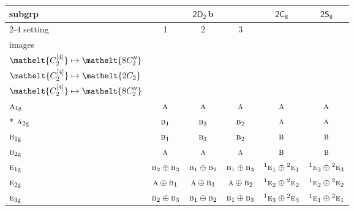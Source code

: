 \documentclass[10pt,a4paper]{article}
\numberwithin{equation}{section}
\newcommand{\eltfont}[1]{{\let\sigma\eltsigma\mathelt{#1}}}
\newcommand{\grp}[1]{\mathsf{#1}}
\newcommand{\irr}[1]{\text{\normalfont\scshape #1}}
\newcommand{\conjpair}[1]{{}^{#1}}
\newcommand{\cls}[1]{\eltfont{#1}}
\newcommand{\ptag}[1]{\mathrm{#1}}
\newcommand{\clsletter}[1]{\,{\scriptsize\color{black!55}#1}}
\newcommand{\genidx}[2]{#1^{[\mathrm{#2}]}}
\begin{document}
{\small\begin{longtable}{@{}lccccc@{}}\toprule
subgrp & \multicolumn{3}{c}{\href{2D2.pdf}{$\grp{2D_{2}}$}\clsletter{b}} & \href{2C8.pdf}{$\grp{2C_{8}}$} & \href{2S8.pdf}{$\grp{2S_{8}}$}\\\cmidrule(lr){2-4}
setting & 1 & 2 & 3 &  & \\
images & {\scriptsize\begin{tabular}[t]{@{}c@{}}$\cls{\genidx{C_{2}}{2}} \mapsto \cls{2C_{2}}$\\$\cls{\genidx{C_{2}}{4}} \mapsto \cls{8C_{2}''}$\end{tabular}} & {\scriptsize\begin{tabular}[t]{@{}c@{}}$\cls{\genidx{C_{2}}{2}} \mapsto \cls{8C_{2}''}$\\$\cls{\genidx{C_{2}}{4}} \mapsto \cls{2C_{2}}$\end{tabular}} & {\scriptsize\begin{tabular}[t]{@{}c@{}}$\cls{\genidx{C_{2}}{2}} \mapsto \cls{8C_{2}''}$\\$\cls{\genidx{C_{2}}{4}} \mapsto \cls{8C_{2}''}$\end{tabular}} &  & \\\midrule\endhead
\bottomrule\endfoot\endlastfoot
$\irr{a}_{1\ptag{g}}$ & $\irr{a}$ & $\irr{a}$ & $\irr{a}$ & $\irr{a}$ & $\irr{a}$\\*
$\irr{a}_{2\ptag{g}}$ & $\irr{b}_{1}$ & $\irr{b}_{3}$ & $\irr{b}_{2}$ & $\irr{a}$ & $\irr{a}$\\
$\irr{b}_{1\ptag{g}}$ & $\irr{b}_{1}$ & $\irr{b}_{3}$ & $\irr{b}_{2}$ & $\irr{b}$ & $\irr{b}$\\
$\irr{b}_{2\ptag{g}}$ & $\irr{a}$ & $\irr{a}$ & $\irr{a}$ & $\irr{b}$ & $\irr{b}$\\
$\irr{e}_{1\ptag{g}}$ & $\irr{b}_{2}\oplus \irr{b}_{3}$ & $\irr{b}_{1}\oplus \irr{b}_{2}$ & $\irr{b}_{1}\oplus \irr{b}_{3}$ & $\conjpair{1}\irr{e}_{1}\oplus \conjpair{2}\irr{e}_{1}$ & $\conjpair{1}\irr{e}_{3}\oplus \conjpair{2}\irr{e}_{3}$\\
$\irr{e}_{2\ptag{g}}$ & $\irr{a}\oplus \irr{b}_{1}$ & $\irr{a}\oplus \irr{b}_{3}$ & $\irr{a}\oplus \irr{b}_{2}$ & $\conjpair{1}\irr{e}_{2}\oplus \conjpair{2}\irr{e}_{2}$ & $\conjpair{1}\irr{e}_{2}\oplus \conjpair{2}\irr{e}_{2}$\\
$\irr{e}_{3\ptag{g}}$ & $\irr{b}_{2}\oplus \irr{b}_{3}$ & $\irr{b}_{1}\oplus \irr{b}_{2}$ & $\irr{b}_{1}\oplus \irr{b}_{3}$ & $\conjpair{1}\irr{e}_{3}\oplus \conjpair{2}\irr{e}_{3}$ & $\conjpair{1}\irr{e}_{1}\oplus \conjpair{2}\irr{e}_{1}$\\

\end{longtable}}
\end{document}
